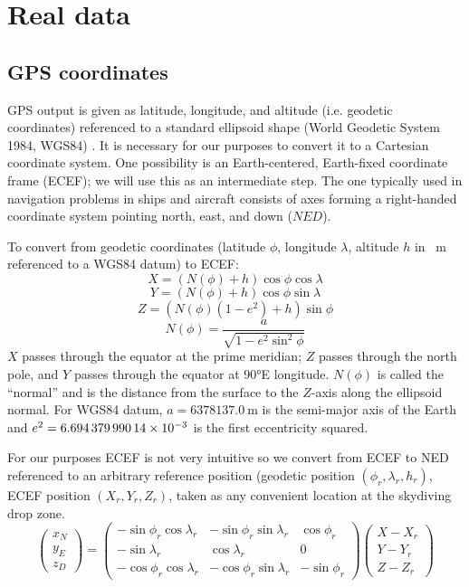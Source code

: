 \documentclass{amsart}
\begin{document}
\section{Real data}
\subsection{GPS coordinates}
GPS output is given as latitude, longitude, and altitude (i.e. geodetic coordinates) referenced to a standard ellipsoid shape (World Geodetic System 1984, WGS84) \cite{Phillips:2004}.  It is necessary for our purposes to convert it to a Cartesian coordinate system.  One possibility is an Earth-centered, Earth-fixed coordinate frame (ECEF); we will use this as an intermediate step.  The one typically used in navigation problems in ships and aircraft consists of axes forming a right-handed coordinate system pointing north, east, and down ($NED$).  

To convert from geodetic coordinates (latitude $\phi$, longitude $\lambda$, altitude $h$ in \SI{}{\meter} referenced to a WGS84 datum) to ECEF: 
\begin{equation}
X = (N(\phi)+h) \cos{\phi} \cos{\lambda}
\end{equation}
\begin{equation}
Y = (N(\phi)+h) \cos{\phi} \sin{\lambda}
\end{equation}
\begin{equation}
Z = (N(\phi)(1-e^2)+h) \sin{\phi}
\end{equation}
\begin{equation}
N(\phi) = \frac{a}{\sqrt{1-e^2 \sin^2{\phi}}}
\end{equation}
$X$ passes through the equator at the prime meridian; $Z$ passes through the north pole, and $Y$ passes through the equator at \ang{90}E longitude.  $N(\phi)$ is called the ``normal'' and is the distance from the surface to the $Z$-axis along the ellipsoid normal.  For WGS84 datum, $a=\SI{6378137.0}{\meter}$ is the semi-major axis of the Earth and $e^2=\SI{6.69437999014E-3}{}$ is the first eccentricity squared. 

For our purposes ECEF is not very intuitive so we convert from ECEF to NED referenced to an arbitrary reference position (geodetic position $(\phi_r,\lambda_r,h_r)$, ECEF position $(X_r,Y_r,Z_r)$, taken as any convenient location at the skydiving drop zone. 
\begin{equation}
\begin{pmatrix}
x_N \\ y_E \\ z_D
\end{pmatrix}
=
\begin{pmatrix}
-\sin{\phi_r}\cos{\lambda_r} & -\sin{\phi_r}\sin{\lambda_r} & \cos{\phi_r} \\
-\sin{\lambda_r} & \cos{\lambda_r} & 0 \\
-\cos{\phi_r}\cos{\lambda_r} & -\cos{\phi_r}\sin{\lambda_r} & -\sin{\phi_r}
\end{pmatrix}
\begin{pmatrix}
X-X_r \\
Y-Y_r \\
Z-Z_r
\end{pmatrix}
\end{equation}
\end{document}
